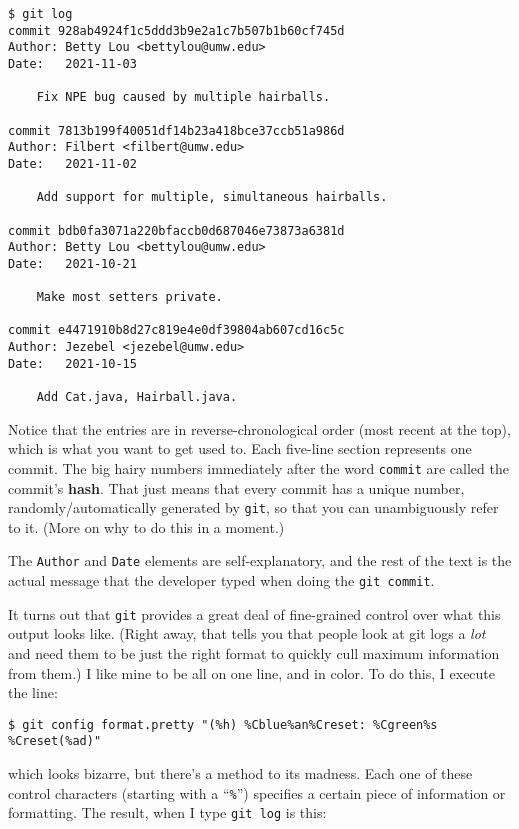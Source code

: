 \label{gitLogOutput}
\begin{Verbatim}[fontsize=\footnotesize,samepage=true,frame=single]
$ git log
commit 928ab4924f1c5ddd3b9e2a1c7b507b1b60cf745d
Author: Betty Lou <bettylou@umw.edu>
Date:   2021-11-03

    Fix NPE bug caused by multiple hairballs.

commit 7813b199f40051df14b23a418bce37ccb51a986d
Author: Filbert <filbert@umw.edu>
Date:   2021-11-02

    Add support for multiple, simultaneous hairballs.

commit bdb0fa3071a220bfaccb0d687046e73873a6381d
Author: Betty Lou <bettylou@umw.edu>
Date:   2021-10-21

    Make most setters private.

commit e4471910b8d27c819e4e0df39804ab607cd16c5c
Author: Jezebel <jezebel@umw.edu>
Date:   2021-10-15

    Add Cat.java, Hairball.java.
\end{Verbatim}

Notice that the entries are in reverse-chronological order (most recent at the
top), which is what you want to get used to. Each five-line section represents
one commit. The big hairy numbers immediately after the word \texttt{commit}
are called the commit's \textbf{hash}. That just means that every commit has a
unique number, randomly/automatically generated by \texttt{git}, so that you
can unambiguously refer to it. (More on why to do this in a moment.)

The \texttt{Author} and \texttt{Date} elements are self-explanatory, and the
rest of the text is the actual message that the developer typed when doing the
\texttt{git commit}.

It turns out that \texttt{git} provides a great deal of fine-grained control
over what this output looks like. (Right away, that tells you that people look
at git logs a \textit{lot} and need them to be just the right format to
quickly cull maximum information from them.) I like mine to be all on one
line, and in color. To do this, I execute the line:

\begin{Verbatim}[fontsize=\scriptsize,samepage=true,frame=none]
$ git config format.pretty "(%h) %Cblue%an%Creset: %Cgreen%s %Creset(%ad)"
\end{Verbatim}

which looks bizarre, but there's a method to its madness. Each one of these
control characters (starting with a ``\texttt{\%}'') specifies a certain piece
of information or formatting. The result, when I type \texttt{git log} is
this:

